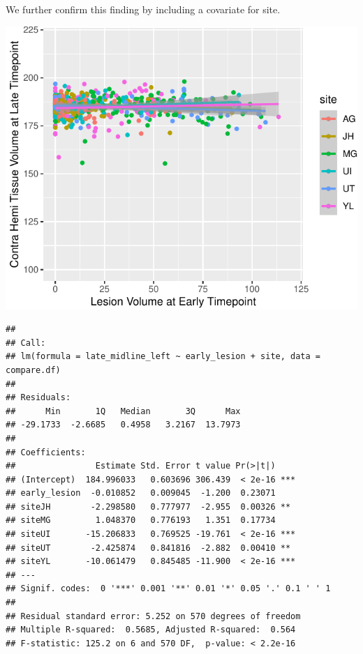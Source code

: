 \documentclass[
]{article}
\begin{document}
We further confirm this finding by including a covariate for site.

\begin{center}\includegraphics{paper_files/figure-latex/plot_harm_contra-1} \end{center}

\begin{verbatim}
## 
## Call:
## lm(formula = late_midline_left ~ early_lesion + site, data = compare.df)
## 
## Residuals:
##      Min       1Q   Median       3Q      Max 
## -29.1733  -2.6685   0.4958   3.2167  13.7973 
## 
## Coefficients:
##                Estimate Std. Error t value Pr(>|t|)    
## (Intercept)  184.996033   0.603696 306.439  < 2e-16 ***
## early_lesion  -0.010852   0.009045  -1.200  0.23071    
## siteJH        -2.298580   0.777977  -2.955  0.00326 ** 
## siteMG         1.048370   0.776193   1.351  0.17734    
## siteUI       -15.206833   0.769525 -19.761  < 2e-16 ***
## siteUT        -2.425874   0.841816  -2.882  0.00410 ** 
## siteYL       -10.061479   0.845485 -11.900  < 2e-16 ***
## ---
## Signif. codes:  0 '***' 0.001 '**' 0.01 '*' 0.05 '.' 0.1 ' ' 1
## 
## Residual standard error: 5.252 on 570 degrees of freedom
## Multiple R-squared:  0.5685, Adjusted R-squared:  0.564 
## F-statistic: 125.2 on 6 and 570 DF,  p-value: < 2.2e-16
\end{verbatim}
\end{document}

